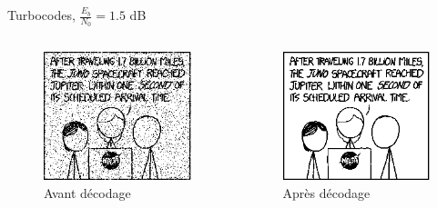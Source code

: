 \documentclass[11pt]{beamer}
\begin{document}
\begin{frame}{Turbocodes, $\frac{E_b}{N_0} = 1.5$ dB}
	\begin{columns}
		\begin{column}{.5\textwidth}
			\begin{figure}
				\includegraphics[scale=0.6]{turbo_noisy_70}\\
				Avant d\'ecodage
			\end{figure}
		\end{column}
		\begin{column}{.5\textwidth}
			\begin{figure}
				\includegraphics[scale=0.6]{turbo_decoded_70}\\
				Apr\`es d\'ecodage
			\end{figure}
		\end{column}
	\end{columns}
\end{frame}
\end{document}
